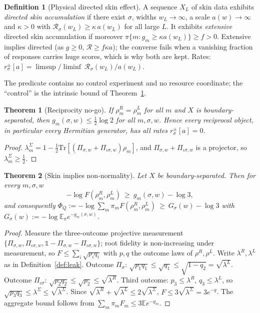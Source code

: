 \documentclass[11pt]{article}
\newtheorem{theorem}{Theorem}
\theoremstyle{definition}
\newtheorem{definition}{Definition}
\theoremstyle{remark}
\newcommand{\Tr}{\mathrm{Tr}}
\newcommand{\E}{\mathbb{E}}
\newcommand{\one}{\mathbb{1}}
\begin{document}
\begin{definition}[Physical directed skin effect]\label{def:phys}
A sequence $X_L$ of skin data exhibits \emph{directed skin accumulation} if there exist $\sigma$, widths $w_L\to\infty$, a scale $a(w)\to\infty$ and $\kappa>0$ with $\mathcal R_\sigma(w_L)\ge\kappa\,a(w_L)$ for all large $L$. It exhibits \emph{extensive} directed skin accumulation if moreover $\pi\{m:g_m\ge\kappa a(w_L)\}\ge f>0$. Extensive implies directed (as $g\ge0$, $\mathcal R\ge f\kappa a$); the converse fails when a vanishing fraction of responses carries huge scores, which is why both are kept.
Rates: $r^{\pm}_\sigma[a]=\limsup/\liminf\ \mathcal R_\sigma(w_L)/a(w_L)$.
\end{definition}
The predicate contains no control experiment and no resource coordinate; the ``control'' is the intrinsic bound of Theorem~\ref{thm:nogo}.

\begin{theorem}[Reciprocity no-go]\label{thm:nogo}
If $\rho^R_m=\rho^L_m$ for all $m$ and $X$ is boundary-separated, then $g_m(\sigma,w)\le\tfrac12\log2$ for all $m,\sigma,w$. Hence every reciprocal object, in particular every Hermitian generator, has all rates $r^\pm_\sigma[a]=0$.
\end{theorem}
\begin{proof}
$\lambda^\Sigma_m=1-\tfrac12\Tr[(\Pi_{\sigma,w}+\Pi_{\iota\sigma,w})\rho_m]$, and $\Pi_{\sigma,w}+\Pi_{\iota\sigma,w}$ is a projector, so $\lambda^\Sigma_m\ge\tfrac12$.
\end{proof}

\begin{theorem}[Skin implies non-normality]\label{thm:B}
Let $X$ be boundary-separated. Then for every $m,\sigma,w$
\[
-\log F(\rho^R_m,\rho^L_m)\ \ge\ g_m(\sigma,w)-\log3,
\]
and consequently $\Phi_Q:=-\log\sum_m\pi_mF(\rho^R_m,\rho^L_m)\ \ge\ G_\sigma(w)-\log3$ with $G_\sigma(w):=-\log\E_\pi e^{-g_m(\sigma,w)}$.
\end{theorem}
\begin{proof}
Measure the three-outcome projective measurement $\{\Pi_{\sigma,w},\Pi_{\iota\sigma,w},\one-\Pi_{\sigma,w}-\Pi_{\iota\sigma,w}\}$; root fidelity is non-increasing under measurement, so $F\le\sum_i\sqrt{p_iq_i}$ with $p,q$ the outcome laws of $\rho^R,\rho^L$. Write $\lambda^R,\lambda^L$ as in Definition~\ref{def:leak}. Outcome $\Pi_\sigma$: $\sqrt{p_1q_1}\le\sqrt{q_1}\le\sqrt{1-q_2}=\sqrt{\lambda^L}$. Outcome $\Pi_{\iota\sigma}$: $\sqrt{p_2q_2}\le\sqrt{p_2}\le\sqrt{\lambda^R}$. Third outcome: $p_3\le\lambda^R$, $q_3\le\lambda^L$, so $\sqrt{p_3q_3}\le\lambda^\Sigma\le\sqrt{\lambda^\Sigma}$. Since $\sqrt{\lambda^R}+\sqrt{\lambda^L}\le2\sqrt{\lambda^\Sigma}$, $F\le3\sqrt{\lambda^\Sigma}=3e^{-g}$. The aggregate bound follows from $\sum_m\pi_mF_m\le3\E e^{-g_m}$.
\end{proof}
\end{document}
